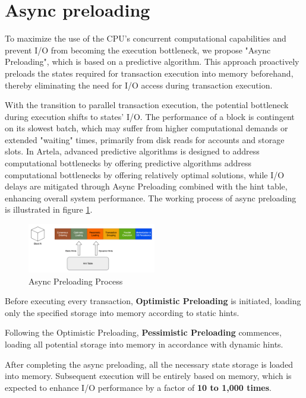 
\section{Async preloading}

To maximize the use of the CPU's concurrent computational capabilities and prevent I/O from becoming the execution bottleneck, we propose "Async Preloading", which is based on a predictive algorithm. This approach proactively preloads the states required for transaction execution into memory beforehand, thereby eliminating the need for I/O access during transaction execution.

With the transition to parallel transaction execution, the potential bottleneck during execution shifts to states’ I/O. The performance of a block is contingent on its slowest batch, which may suffer from higher computational demands or extended "waiting" times, primarily from disk reads for accounts and storage slots. In Artela, advanced predictive algorithms is designed to address computational bottlenecks by offering predictive algorithms address computational bottlenecks by offering relatively optimal solutions, while I/O delays are mitigated through Async Preloading combined with the hint table, enhancing overall system performance. The working process of async preloading is illustrated in figure \ref{fig:async_preloading}.

\begin{figure}[htp]
  \centering
  \includegraphics[width=0.5\textwidth]{sections/images/async-preloading.png}
  \caption{Async Preloading Process}
  \label{fig:async_preloading}
\end{figure}

Before executing every transaction, \textbf{Optimistic Preloading} is initiated, loading only the specified storage into memory according to static hints.

Following the Optimistic Preloading, \textbf{Pessimistic Preloading} commences, loading all potential storage into memory in accordance with dynamic hints.

After completing the async preloading, all the necessary state storage is loaded into memory. Subsequent execution will be entirely based on memory, which is expected to enhance I/O performance by a factor of \textbf{10 to 1,000 times}.


